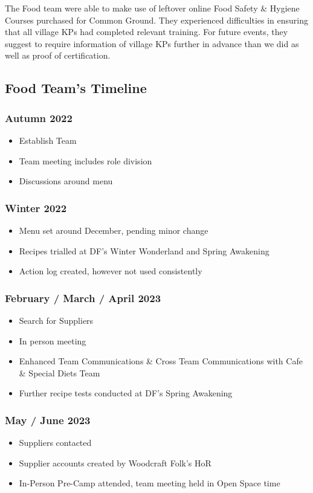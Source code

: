 The Food team were able to make use of leftover online Food Safety \& Hygiene Courses purchased for Common Ground. They experienced difficulties in ensuring that all village KPs had completed relevant training. For future events, they suggest to require information of village KPs further in advance than we did as well as proof of certification.

\subsection{Food Team's Timeline}
\subsubsection{Autumn 2022}
\begin{itemize}
    \item Establish Team
    \item Team meeting includes role division
    \item Discussions around menu
\end{itemize}
\subsubsection{Winter 2022}
\begin{itemize}
    \item Menu set around December, pending minor change
    \item Recipes trialled at DF's Winter Wonderland and Spring Awakening
    \item Action log created, however not used consistently
\end{itemize}
\subsubsection{February / March / April 2023}
\begin{itemize}
    \item Search for Suppliers
    \item In person meeting
    \item Enhanced Team Communications \& Cross Team Communications with Cafe \& Special  Diets Team
    \item Further recipe tests conducted at DF's Spring Awakening
\end{itemize}
\subsubsection{May / June 2023}
\begin{itemize}
    \item Suppliers contacted
    \item Supplier accounts created by Woodcraft Folk's HoR
    \item In-Person Pre-Camp attended, team meeting held in Open Space time    
\end{itemize}
